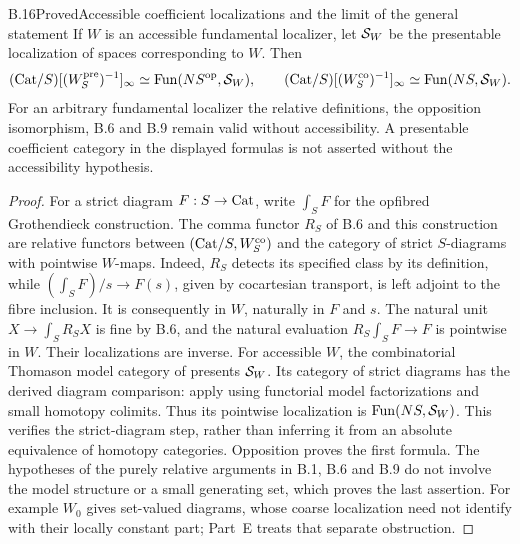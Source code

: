 \begin{claim}{B.16}{Proved}{Accessible coefficient localizations and the limit of the general statement}
If $W$ is an accessible fundamental localizer, let $\mathcal S_W$ be the
presentable localization of spaces corresponding to $W$. Then
\[
 (\mathrm{Cat}/S)[(W^{\mathrm{pre}}_S)^{-1}]_\infty
 \simeq\mathrm{Fun}(NS^{\mathrm{op}},\mathcal S_W),\qquad
 (\mathrm{Cat}/S)[(W^{\mathrm{co}}_S)^{-1}]_\infty
 \simeq\mathrm{Fun}(NS,\mathcal S_W).
\]
For an arbitrary fundamental localizer the relative definitions, the
opposition isomorphism, B.6 and B.9 remain valid without accessibility.
A presentable coefficient category in the displayed formulas is not
asserted without the accessibility hypothesis.
\end{claim}
\begin{proof}
For a strict diagram $F:S\to\mathrm{Cat}$, write $\int_SF$ for the opfibred
Grothendieck construction. The comma functor $R_S$ of B.6 and this
construction are relative functors between
$(\mathrm{Cat}/S,W^{\mathrm{co}}_S)$ and the category of strict $S$-diagrams
with pointwise $W$-maps. Indeed, $R_S$ detects its specified class by
its definition, while $(\int_SF)/s\to F(s)$, given by cocartesian
transport, is left adjoint to the fibre inclusion. It is consequently in
$W$, naturally in $F$ and $s$. The natural unit
$X\to\int_SR_SX$ is fine by B.6, and the natural evaluation
$R_S\int_SF\to F$ is pointwise in $W$. Their localizations are inverse.
For accessible $W$, the combinatorial Thomason model category of
\citet[Theorem 5.2.15]{BCCisinski2006} presents $\mathcal S_W$.
Its category of strict diagrams has the derived diagram comparison:
\citet[Example 7.9.6 and Theorem 7.9.8]{BCCisinski2019} apply using
functorial model factorizations and small homotopy colimits. Thus its
pointwise localization is $\mathrm{Fun}(NS,\mathcal S_W)$. This verifies the
strict-diagram step, rather than inferring it from an absolute equivalence
of homotopy categories. Opposition proves the first formula.
The hypotheses of the purely relative arguments in B.1, B.6 and B.9 do
not involve the model structure or a small generating set, which proves
the last assertion. For example $W_0$ gives set-valued diagrams, whose
coarse localization need not identify with their locally constant part;
Part~E treats that separate obstruction.
\end{proof}


